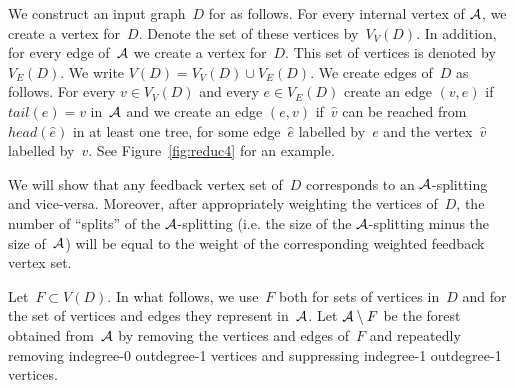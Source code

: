We construct an input graph~$D$ for \dfvs as follows. For every internal vertex of ${\mathcal A}$, we create a vertex for~$D$. Denote the set of these vertices by~$V_V(D)$. In addition, for every edge of~${\mathcal A}$ we create a vertex for~$D$. This set of vertices is denoted by~$V_E(D)$. We write $V(D)= V_V(D) \cup V_E(D)$. We create edges of~$D$ as follows. For every $v \in V_V(D)$ and every $e\in V_E(D)$ create an edge $(v,e)$ if $tail(e)=v$ in~${\mathcal A}$ and we create an edge $(e,v)$ if~$\hat{v}$ can be reached from $head(\hat{e})$ in at least one tree, for some edge~$\hat{e}$ labelled by~$e$ and the vertex~$\hat{v}$ labelled by~$v$. See Figure~\ref{fig:reduc4} for an example.

We will show that any feedback vertex set of~$D$ corresponds to an ${\mathcal A}$-splitting and vice-versa. Moreover, after appropriately weighting the vertices of~$D$, the number of ``splits'' of the ${\mathcal A}$-splitting (i.e. the size of the ${\mathcal A}$-splitting minus the size of~${\mathcal A}$) will be equal to the weight of the corresponding weighted feedback vertex set.

Let~$F\subset V(D)$. In what follows, we use~$F$ both for sets of vertices in~$D$ and for the set of vertices and edges they represent in~${\mathcal A}$. Let ${\mathcal A} \setminus F$ be the forest obtained from~${\mathcal A}$ by removing the vertices and edges of~$F$ and repeatedly removing indegree-0 outdegree-1 vertices and suppressing indegree-1 outdegree-1 vertices.

